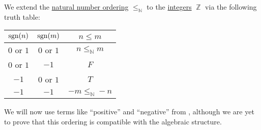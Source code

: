 \begin{definition}\label{def:integer_ordering}\mimprovised
  We extend the \hyperref[def:natural_numbers_ordering]{natural number ordering} \( \leq_\BbbN \) to the \hyperref[def:integers]{integers} \( \BbbZ \) via the following truth table:
  \begin{center}
    \begin{tabular}{c c c}
      \( \operatorname{sgn}(n) \)      & \( \operatorname{sgn}(m) \)      & \( n \leq m \)       \\
      \hline
      \( 0 \) or \( 1 \) & \( 0 \) or \( 1 \) & \( n \leq_\BbbN m \) \\
      \( 0 \) or \( 1 \) & \( -1 \)           & \( F \)              \\
      \( -1 \)           & \( 0 \) or \( 1 \) & \( T \)              \\
      \( -1 \)           & \( -1 \)           & \( -m \leq_\BbbN -n \)
    \end{tabular}
  \end{center}
\end{definition}
\begin{comments}
  \item We will now use terms like \enquote{positive} and \enquote{negative} from , although we are yet to prove that this ordering is compatible with the algebraic structure.
\end{comments}

